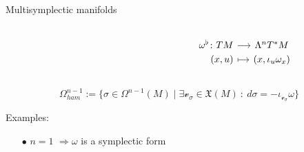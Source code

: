 \documentclass[handout,10pt]{beamer}
\begin{document}
\begin{frame}[fragile]{Multisymplectic manifolds} %
	\begin{defblock}
		
	\end{defblock}
	\begin{defblock}
		\begin{columns}
			\begin{column}{.5\linewidth}
			\end{column}
			\begin{column}{.5\linewidth}
						\vspace{-.5em}
				\[
				\begin{tikzcd}[column sep= small,row sep=0ex,
				/tikz/column 1/.append style={anchor=base east}]
				    \omega^\flat \colon T M \ar[r]& \Lambda^n T^\ast M \\
  						 (x,u) \ar[r, mapsto]& (x,\iota_{u} \omega_x)						
				\end{tikzcd}	
				\]
			\end{column}
		\end{columns}
	\end{defblock}
	\pause
	\begin{defblock}
		\begin{displaymath}
			\Omega^{n-1}_{ham} 	:=
			\biggr\{ \sigma \in  \Omega^{n-1}(M) \; \biggr\vert \; 
				\exists \mathscr{v}_\sigma \in \mathfrak{X}(M) ~:~ d \sigma = -\iota_{\mathscr{v}_\sigma} \omega \biggr\} 
			\end{displaymath}
	\end{defblock}
	\pause					
	\vfill
	\begin{block}{Examples:}
		\vspace{-.5em}
		\begin{itemize}
			\item[$\bullet$] $n=1$ \qquad\qquad\qquad $\Rightarrow$\quad $\omega$ is a symplectic form

\end{itemize}
\end{block}
\end{frame}
\end{document}
